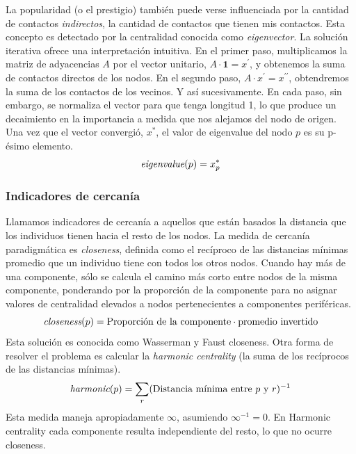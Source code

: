 \documentclass[a4paper,11pt]{book}
\theoremstyle{definition}
\begin{document}

La popularidad (o el prestigio) tambi\'en puede verse influenciada por la cantidad de contactos \emph{indirectos}, la cantidad de contactos que tienen mis contactos.
%
Esta concepto es detectado por la centralidad conocida como \emph{eigenvector}.
%
La soluci\'on iterativa ofrece una interpretaci\'on intuitiva.
%
En el primer paso, multiplicamos la matriz de adyacencias $A$ por el vector unitario, $A \cdot \bm{1} = x^{\prime}$, y obtenemos la suma de contactos directos de los nodos.
%
En el segundo paso, $A \cdot x^{\prime} =  x^{\prime\prime}$, obtendremos la suma de los contactos de los vecinos.
%
Y as\'i sucesivamente.
%
En cada paso, sin embargo, se normaliza el vector para que tenga longitud 1, lo que produce un decaimiento en la importancia a medida que nos alejamos del nodo de origen.
%
Una vez que el vector convergi\'o, $x^*$, el valor de eigenvalue del nodo $p$ es su p-\'esimo elemento.
%
\begin{equation}
\emph{eigenvalue}(p) = x^{*}_p
\end{equation}


\subsubsection{Indicadores de cercan\'ia}

Llamamos indicadores de cercan\'ia a aquellos que est\'an basados la distancia que los individuos tienen hacia el resto de los nodos.
%
La medida de cercan\'ia paradigm\'atica es \emph{closeness}, definida como el rec\'iproco de las distancias m\'inimas promedio que un individuo tiene con todos los otros nodos.
%
Cuando hay m\'as de una componente, s\'olo se calcula el camino m\'as corto entre nodos de la misma componente, ponderando por la proporci\'on de la componente para no asignar valores de centralidad elevados a nodos pertenecientes a componentes perif\'ericas.
%
\begin{equation}
	\emph{closeness}(p) = { \text{Proporci\'on de la componente}  \cdot   \text{promedio invertido} }
\end{equation}
%
Esta soluci\'on es conocida como Wasserman y Faust closeness.
%
Otra forma de resolver el problema es calcular la \emph{harmonic centrality} (la suma de los rec\'iprocos de las distancias m\'inimas).
%
\begin{equation} \label{eq:harmonic}
    \emph{harmonic}(p)= \sum_r (\text{Distancia m\'inima entre $p$ y $r$})^{-1}
\end{equation}
%
Esta medida maneja apropiadamente $\infty$, asumiendo $\infty^{-1} = 0$.
%
En Harmonic centrality cada componente resulta independiente del resto, lo que no ocurre closeness.
\end{document}
